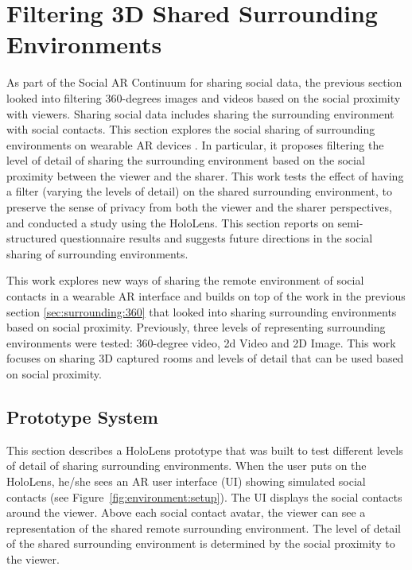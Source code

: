 \pagebreak
\section{Filtering 3D Shared Surrounding Environments}
\label{sec:surrounding:environment}

As part of the Social AR Continuum for sharing social data, the previous section looked into filtering 360-degrees images and videos based on the social proximity with viewers. Sharing social data includes sharing the surrounding environment with social contacts. This section explores the social sharing of surrounding environments on wearable AR devices \cite{Nassani2018b}. In particular, it proposes filtering the level of detail of sharing the surrounding environment based on the social proximity between the viewer and the sharer. This work tests the effect of having a filter (varying the levels of detail) on the shared surrounding environment, to preserve the sense of privacy from both the viewer and the sharer perspectives, and conducted a study using the HoloLens. This section reports on semi-structured questionnaire results and suggests future directions in the social sharing of surrounding environments.

This work explores new ways of sharing the remote environment of social contacts in a wearable AR interface and builds on top of the work in the previous section \ref{sec:surrounding:360}  that looked into sharing surrounding environments based on social proximity. Previously, three levels of representing surrounding environments were tested: 360-degree video, 2d Video and 2D Image. This work focuses on sharing 3D captured rooms and levels of detail that can be used based on social proximity. 

\subsection{Prototype System}

This section describes a HoloLens prototype that was built to test different levels of detail of sharing surrounding environments. When the user puts on the HoloLens, he/she sees an AR user interface (UI) showing simulated social contacts (see Figure~\ref{fig:environment:setup}). The UI displays the social contacts around the viewer. Above each social contact avatar, the viewer can see a representation of the shared remote surrounding environment. The level of detail of the shared surrounding environment is determined by the social proximity to the viewer.

